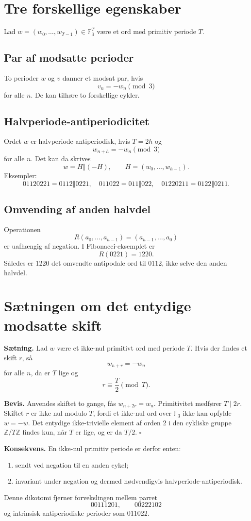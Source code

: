 \documentclass[11pt,a4paper]{article}
\newcommand{\F}{\mathbb{F}}
\newcommand{\Z}{\mathbb{Z}}
\newcommand{\oplusword}{\mathbin{\Vert}}
\begin{document}
\section{Tre forskellige egenskaber}
Lad $w=(w_0,\ldots,w_{T-1})\in\F_3^T$ være et ord med primitiv periode $T$.

\subsection{Par af modsatte perioder}
To perioder $w$ og $v$ danner et modsat par, hvis
\[
v_n=-w_n\pmod 3
\]
for alle $n$. De kan tilhøre to forskellige cykler.

\subsection{Halvperiode-antiperiodicitet}
Ordet $w$ er halvperiode-antiperiodisk, hvis $T=2h$ og
\[
w_{n+h}=-w_n\pmod 3
\]
for alle $n$. Det kan da skrives
\[
w=H\oplusword(-H),\qquad H=(w_0,\ldots,w_{h-1}).
\]
Eksempler:
\[
01120221=0112\oplusword0221,\quad 011022=011\oplusword022,\quad 01220211=0122\oplusword0211.
\]

\subsection{Omvending af anden halvdel}
Operationen
\[
R(a_0,\ldots,a_{h-1})=(a_{h-1},\ldots,a_0)
\]
er uafhængig af negation. I Fibonacci-eksemplet er
\[
R(0221)=1220.
\]
Således er 1220 det omvendte antipodale ord til 0112, ikke selve den anden halvdel.

\clearpage
\section{Sætningen om det entydige modsatte skift}
\textbf{Sætning.} Lad $w$ være et ikke-nul primitivt ord med periode $T$. Hvis der findes et skift $r$, så
\[
w_{n+r}=-w_n
\]
for alle $n$, da er $T$ lige og
\[
r\equiv \frac{T}{2}\pmod T.
\]

\textbf{Bevis.} Anvendes skiftet to gange, fås $w_{n+2r}=w_n$. Primitivitet medfører $T\mid 2r$. Skiftet $r$ er ikke nul modulo $T$, fordi et ikke-nul ord over $\F_3$ ikke kan opfylde $w=-w$. Det entydige ikke-trivielle element af orden 2 i den cykliske gruppe $\Z/T\Z$ findes kun, når $T$ er lige, og er da $T/2$. \hfill$\square$

\textbf{Konsekvens.} En ikke-nul primitiv periode er derfor enten:
\begin{enumerate}
\item sendt ved negation til en anden cykel;
\item invariant under negation og dermed nødvendigvis halvperiode-antiperiodisk.
\end{enumerate}
Denne dikotomi fjerner forvekslingen mellem parret
\[
00111201,\qquad 00222102
\]
og intrinsisk antiperiodiske perioder som 011022.
\end{document}
